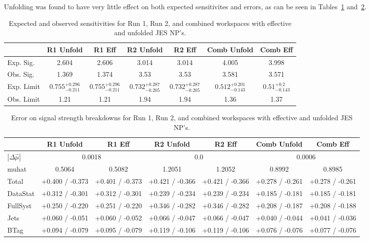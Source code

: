 Unfolding was found to have very little effect on both expected sensitivites and errors, as can be seen in Tables~\ref{tab:unfold_jes_sensitivities} and~\ref{tab:unfold_jes_breakdowns}.
\begin{table}[!htbp]
\begin{center}\begin{tabular}{lcccccc}
\hline\hline
 & R1 Unfold & R1 Eff & R2 Unfold & R2 Eff & Comb Unfold & Comb Eff\\
\hline
Exp. Sig. &  2.604 & 2.606 & 3.014 & 3.014 & 4.005 & 3.998\\
Obs. Sig. & 1.369 & 1.374 & 3.53 & 3.53 & 3.581 & 3.571\\
\hline
Exp. Limit &  $0.755^{+0.296}_{-0.211}$ & $0.755^{+0.296}_{-0.211}$ & $0.732^{+0.287}_{-0.205}$ & $0.732^{+0.287}_{-0.205}$ & $0.512^{+0.201}_{-0.143}$ & $0.51^{+0.2}_{-0.143}$\\
Obs. Limit & 1.21 & 1.21 & 1.94 & 1.94 & 1.36 & 1.37\\
\hline\hline
\end{tabular}
\caption{Expected and observed sensitivities for Run 1, Run 2, and combined workspaces with effective and unfolded JES NP's.}
\end{center}
\label{tab:unfold_jes_sensitivities}
\end{table}

\begin{table}[htbp]
\begin{center}\begin{tabular}{|l|c|c|c|c|c|c|}
\hline\hline
 & R1 Unfold & R1 Eff & R2 Unfold & R2 Eff & Comb Unfold & Comb Eff\\
\hline
$\left|\Delta\hat{\mu}\right|$ &  \multicolumn{2}{|c|}{0.0018} &  \multicolumn{2}{|c|}{0.0} &  \multicolumn{2}{|c|}{0.0006}\\
muhat & 0.5064 & 0.5082 & 1.2051 & 1.2052 & 0.8992 & 0.8985\\
\hline
Total &  +0.400 / -0.373  &  +0.401 / -0.373  &  +0.421 / -0.366  &  +0.421 / -0.366  &  +0.278 / -0.261  &  +0.278 / -0.261 \\
DataStat &  +0.312 / -0.301  &  +0.312 / -0.301  &  +0.239 / -0.234  &  +0.239 / -0.234  &  +0.185 / -0.181  &  +0.185 / -0.181 \\
FullSyst &  +0.250 / -0.220  &  +0.251 / -0.220  &  +0.346 / -0.282  &  +0.346 / -0.282  &  +0.208 / -0.187  &  +0.208 / -0.188 \\
\hline
Jets &  +0.060 / -0.051  &  +0.060 / -0.052  &  +0.066 / -0.047  &  +0.066 / -0.047  &  +0.040 / -0.044  &  +0.041 / -0.036 \\
BTag &  +0.094 / -0.079  &  +0.095 / -0.079  &  +0.119 / -0.106  &  +0.119 / -0.106  &  +0.076 / -0.076  &  +0.077 / -0.076 \\
\hline
\hline
\end{tabular}
\caption{Error on signal strength breakdowns for  Run 1, Run 2, and combined workspaces with effective and unfolded JES NP's.}
\label{tab:unfold_jes_breakdowns}
\end{center}
\end{table}


